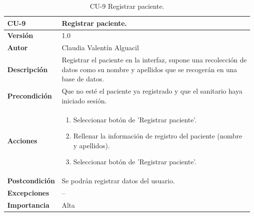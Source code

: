 \begin{table}[p]
	\centering
	\begin{tabularx}{\linewidth}{ p{} p{} }
		\toprule
		\textbf{CU-9}    & \textbf{Registrar paciente.}\\
		\toprule
		\textbf{Versión}              & 1.0    \\
		\textbf{Autor}                & Claudia Valentín Alguacil \\
		 
		\textbf{Descripción}          & Registrar el paciente en la interfaz, supone una recolección de datos como su nombre y apellidos que se recogerán en una base de datos. \\
		\textbf{Precondición}  & Que no esté el paciente ya registrado y que el sanitario haya iniciado sesión.\\
		\textbf{Acciones}             &
		\begin{enumerate}
			\def\labelenumi{\arabic{enumi}.}
			\tightlist
                \item Seleccionar botón de 'Registrar paciente'.
                \item Rellenar la información de registro del paciente (nombre y apellidos).
                \item Seleccionar botón de 'Registrar paciente'.
		\end{enumerate}\\
		\textbf{Postcondición} &  Se podrán registrar datos del usuario. \\
		\textbf{Excepciones} & -- \\
		\textbf{Importancia}          & Alta \\
		\bottomrule
	\end{tabularx}
	\caption{CU-9 Registrar paciente.}
\end{table}



